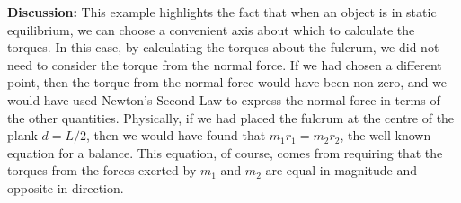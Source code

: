 \begin{example}
\textbf{Discussion: }This example highlights the fact that when an object is in static equilibrium, we can choose a convenient axis about which to calculate the torques. In this case, by calculating the torques about the fulcrum, we did not need to consider the torque from the normal force. If we had chosen a different point, then the torque from the normal force would have been non-zero, and we would have used Newton's Second Law to express the normal force in terms of the other quantities. Physically, if we had placed the fulcrum at the centre of the plank $d = L/2$, then we would have found that $m_1r_1 = m_2r_2$, the well known equation for a balance. This equation, of course, comes from requiring that the torques from the forces exerted by $m_1$ and $m_2$ are equal in magnitude and opposite in direction.
\end{example}

